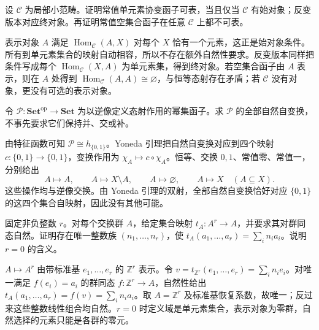 \begin{exercise}\label{b4:ex:03-constant-representable}
	设 \(\mathcal C\) 为局部小范畴。证明常值单元素协变函子可表，当且仅当 \(\mathcal C\) 有始对象；反变版本对应终对象。再证明常值空集合函子在任意 \(\mathcal C\) 上都不可表。
\end{exercise}
\begin{solution}
	表示对象 \(A\) 满足 \(\operatorname{Hom}_{\mathcal C}(A,X)\) 对每个 \(X\) 恰有一个元素，这正是始对象条件。所有到单元素集合的映射自动相容，所以不存在额外自然性要求。反变版本同样把条件写成每个 \(\operatorname{Hom}_{\mathcal C}(X,A)\) 为单元素集，得到终对象。若空集合函子由 \(A\) 表示，则在 \(A\) 处得到 \(\operatorname{Hom}_{\mathcal C}(A,A)\cong\varnothing\)，与恒等态射存在矛盾；若 \(\mathcal C\) 没有对象，更没有可选的表示对象。
\end{solution}

\begin{exercise}\label{b4:ex:03-powerset-operations}
	令 \(\mathcal P:\mathbf{Set}^{\mathrm{op}}\rightarrow\mathbf{Set}\) 为以逆像定义态射作用的幂集函子。求 \(\mathcal P\) 的全部自然自变换，不事先要求它们保持并、交或补。
\end{exercise}
\begin{solution}
	由特征函数可知 \(\mathcal P\cong h_{\{0,1\}}\)。Yoneda 引理把自然自变换对应到四个映射 \(c:\{0,1\}\rightarrow\{0,1\}\)，变换作用为 \(\chi_A\mapsto c\circ\chi_A\)。恒等、交换 \(0,1\)、常值零、常值一，分别给出
	\[
		A\longmapsto A,\qquad A\longmapsto X\setminus A, \qquad A\longmapsto\varnothing,\qquad A\longmapsto X \quad(A\subseteq X).
	\]
	这些操作均与逆像交换。由 Yoneda 引理的双射，全部自然自变换恰好对应 \(\{0,1\}\) 的这四个集合自映射，因此没有其他可能。
\end{solution}

\begin{exercise}\label{b4:ex:03-natural-multioperations}
	固定非负整数 \(r\)。对每个交换群 \(A\)，给定集合映射 \(t_A:A^r\rightarrow A\)，并要求其对群同态自然。证明存在唯一整数族 \((n_1,\ldots,n_r)\)，使 \(t_A(a_1,\ldots,a_r)=\sum_i n_i a_i\)。说明 \(r=0\) 的含义。
\end{exercise}
\begin{solution}
	\(A\mapsto A^r\) 由带标准基 \(e_1,\ldots,e_r\) 的 \(\mathbb Z^r\) 表示。令 \(v=t_{\mathbb Z^r}(e_1,\ldots,e_r)=\sum_i n_ie_i\)。对唯一满足 \(f(e_i)=a_i\) 的群同态 \(f:\mathbb Z^r\rightarrow A\)，自然性给出 \(t_A(a_1,\ldots,a_r)=f(v)=\sum_i n_ia_i\)。取 \(A=\mathbb Z^r\) 及标准基恢复系数，故唯一；反过来这些整数线性组合均自然。\(r=0\) 时定义域是单元素集合，表示对象为零群，自然选择的元素只能是各群的零元。
\end{solution}

